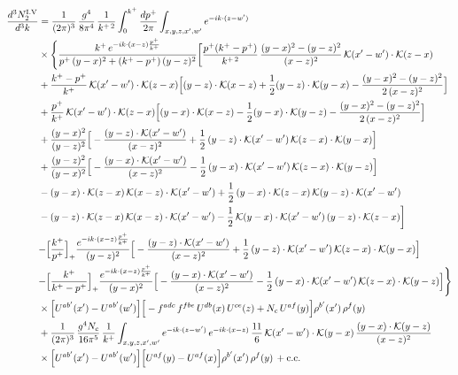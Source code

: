 \documentclass[9pt]{article}
\numberwithin{equation}{section}
\begin{document}
\begin{align}
\frac{d^{3}N^{\rm I.V}_{2}}{d^{3}k} & =\frac{1}{(2\pi)^{3}}\,\frac{g^{4}}{8\pi^{4}}\,\frac{1}{k^{+\,2}}\int_{0}^{k^{+}}\frac{dp^{+}}{2\pi}\int_{x,y,z,x',w'}e^{-ik\cdot{(z-w')}}\notag\\
&\times\Bigg\{\frac{k^{+}\,e^{-ik\cdot{(x-z)}\frac{p^{+}}{k^{+}}}}{p^{+}\,(y-x)^{2}+(k^{+}-p^{+})\,(y-z)^{2}}\bigg[\frac{p^{+}(k^{+}-p^{+})}{k^{+\,2}}\,\frac{(y-x)^{2}-(y-z)^{2}}{(x-z)^{2}}\,\mathcal{K}(x'-w')\cdot\mathcal{K}(z-x)\notag\\
&+\frac{k^{+}-p^{+}}{k^{+}}\,\mathcal{K}(x'-w')\cdot\mathcal{K}(z-x)\Big[(y-z)\cdot\mathcal{K}(x-z)+\frac{1}{2}(y-z)\cdot\mathcal{K}(y-x)-\frac{(y-x)^{2}-(y-z)^{2}}{2\,(x-z)^{2}}\Big]\notag\\
&+\frac{p^{+}}{k^{+}}\,\mathcal{K}(x'-w')\cdot\mathcal{K}(z-x)\Big[(y-x)\cdot\mathcal{K}(x-z)-\frac{1}{2}(y-x)\cdot\mathcal{K}(y-z)-\frac{(y-x)^{2}-(y-z)^{2}}{2\,(x-z)^{2}}\Big]\notag\\
&+\frac{(y-x)^{2}}{(y-z)^{2}}\Big[-\frac{(y-z)\cdot\mathcal{K}(x'-w')}{(x-z)^{2}}+\frac{1}{2}\,(y-z)\cdot\mathcal{K}(x'-w')\,\mathcal{K}(z-x)\cdot\mathcal{K}(y-x)\Big]\notag\\
&+\frac{(y-z)^{2}}{(y-x)^{2}}\Big[-\frac{(y-x)\cdot\mathcal{K}(x'-w')}{(x-z)^{2}}-\frac{1}{2}\,(y-x)\cdot\mathcal{K}(x'-w')\,\mathcal{K}(z-x)\cdot\mathcal{K}(y-z)\Big]\notag\\
&-(y-x)\cdot\mathcal{K}(z-x)\,\mathcal{K}(x-z)\cdot\mathcal{K}(x'-w')+\frac{1}{2}\,(y-x)\cdot\mathcal{K}(z-x)\,\mathcal{K}(y-z)\cdot\mathcal{K}(x'-w')\notag\\
&-(y-z)\cdot\mathcal{K}(z-x)\,\mathcal{K}(x-z)\cdot\mathcal{K}(x'-w')-\frac{1}{2}\,\mathcal{K}(y-x)\cdot\mathcal{K}(x'-w')\,(y-z)\cdot\mathcal{K}(z-x)\bigg]\notag\\
&{-\Big[\frac{k^{+}}{p^{+}}\Big]_{+}\frac{e^{-ik\cdot{(x-z)}\frac{p^{+}}{k^{+}}}}{(y-z)^{2}}\Big[-\frac{(y-z)\cdot\mathcal{K}(x'-w')}{(x-z)^{2}}+\frac{1}{2}\,(y-z)\cdot\mathcal{K}(x'-w')\,\mathcal{K}(z-x)\cdot\mathcal{K}(y-x)\Big]}\notag\\
&{-\Big[\frac{k^{+}}{k^{+}-p^{+}}\Big]_{+}\frac{e^{-ik\cdot{(x-z)}\frac{p^{+}}{k^{+}}}}{(y-x)^{2}}\Big[-\frac{(y-x)\cdot\mathcal{K}(x'-w')}{(x-z)^{2}}-\frac{1}{2}\,(y-x)\cdot\mathcal{K}(x'-w')\,\mathcal{K}(z-x)\cdot\mathcal{K}(y-z)\Big]}\Bigg\}\notag\\
&\times\Big[U^{ab'}(x')-U^{ab'}(w')\Big]\Big[-f^{adc}\,f^{fbe}\,U^{db}(x)\,U^{ce}(z)+N_{c}\,U^{af}(y)\Big]\rho^{b'}(x')\,\rho^{f}(y)\notag\\
&+\frac{1}{(2\pi)^{3}}\,\frac{g^{4}N_{c}}{16\pi^{5}}\,\frac{1}{k^{+}}\int_{x,y,z,x',w'}e^{-ik\cdot{(z-w')}}\,e^{-ik\cdot{(x-z)}}\,\frac{11}{6}\,\mathcal{K}(x'-w')\cdot\mathcal{K}(y-x)\,\frac{(y-x)\cdot\mathcal{K}(y-z)}{(x-z)^{2}}\notag\\
&\times\Big[U^{ab'}(x')-U^{ab'}(w')\Big]\Big[U^{af}(y)-U^{af}(x)\Big]\rho^{b'}(x')\,\rho^{f}(y)\,+ {\rm c.c.}
\label{eq:D-I.V-2o}
\end{align}
\end{document}
